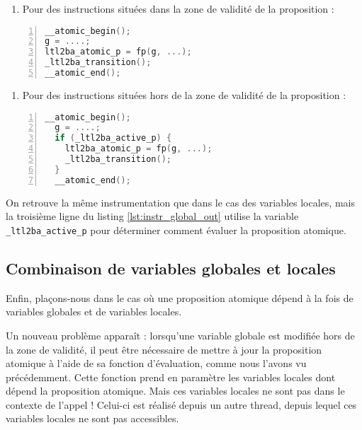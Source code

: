 \begin{enumerate}
\def\labelenumi{\arabic{enumi})}
\item
  Pour des instructions situées dans la zone de validité de la
  proposition :
\end{enumerate}

\begin{lstlisting}[language=C, frame=single, numbers=left, xleftmargin=1.6em,
  caption=Instrumentation pour une variable globale dans la zone de validité]
__atomic_begin();
g = ....;
ltl2ba_atomic_p = fp(g, ...);
_ltl2ba_transition();
__atomic_end();
\end{lstlisting}

\begin{enumerate}
\def\labelenumi{\arabic{enumi})}
\setcounter{enumi}{1}
\item
  Pour des instructions situées hors de la zone de validité de la
  proposition :
\end{enumerate}

\begin{lstlisting}[language=C, frame=single, numbers=left, label=lst:instr_global_out,
  xleftmargin=1.6em,
  caption=Instrumentation pour une variable globale hors de la zone de validité]
  __atomic_begin();
  g = ....;
  if (_ltl2ba_active_p) {
    ltl2ba_atomic_p = fp(g, ...);
    _ltl2ba_transition();
  }
  __atomic_end();
\end{lstlisting}

On retrouve la même instrumentation que dans le cas des variables locales,
mais la troisième ligne du listing \ref{lst:instr_global_out} utilise la
variable \texttt{\_ltl2ba\_active\_p} pour déterminer comment évaluer la
proposition atomique.

\subsection{Combinaison de variables globales et locales}

Enfin, plaçons-nous dans le cas où une proposition atomique dépend à la
fois de variables globales et de variables locales.

Un nouveau problème apparaît : lorsqu'une variable globale est modifiée
hors de la zone de validité, il peut être nécessaire de mettre à jour la
proposition atomique à l'aide de sa fonction d'évaluation, comme nous
l'avons vu précédemment. Cette fonction prend en paramètre les variables
locales dont dépend la proposition atomique. Mais ces variables locales
ne sont pas dans le contexte de l'appel ! Celui-ci est réalisé depuis un
autre thread, depuis lequel ces variables locales ne sont pas
accessibles.

